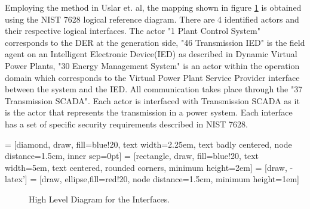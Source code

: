 Employing the method in Uslar et. al\cite{uslar2014security}, the mapping shown in figure \ref{fig:HLdiag} is obtained using the NIST 7628 logical reference diagram\cite{NIST7628:2014}. There are 4 identified actors and their respective logical interfaces. The actor "1 Plant Control System" corresponds to the DER at the generation side, "46 Transmission IED" is the field agent on an Intelligent Electronic Device(IED) as described in Dynamic Virtual Power Plants, "30 Energy Management System" is an actor within the operation domain which corresponds to the Virtual Power Plant Service Provider interface between the system and the IED. All communication takes place through the "37 Transmission SCADA". Each actor is interfaced with Transmission SCADA as it is the actor that represents the transmission in a power system. Each interface has a set of specific security requirements described in NIST 7628. 

 = [diamond, draw, fill=blue!20, 
    text width=2.25em, text badly centered, node distance=1.5cm, inner sep=0pt]
 = [rectangle, draw, fill=blue!20, 
    text width=5em, text centered, rounded corners, minimum height=2em]
 = [draw, -latex']
 = [draw, ellipse,fill=red!20, node distance=1.5cm,
    minimum height=1em]
\begin{figure}[H]
\caption{High Level Diagram for the Interfaces.}
 \label{fig:HLdiag}
\end{figure}

